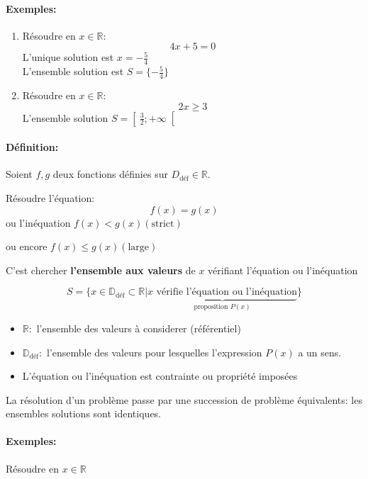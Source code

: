 \documentclass[
    11pt,
    a4paper,
    oneside,
    headinlcude, footinclude,
    twoside,
]{report}
\begin{document}
\paragraph{Exemples:}

\begin{enumerate}
    \item Résoudre en $x \in \mathbb{R}$:
        $$4x + 5 = 0$$
        L'unique solution est $x = - \frac{5}{4}$ \\
        L'ensemble solution est $S = \{- \frac{5}{4}\}$ 
    \item Résoudre en $x \in \mathbb{R}$:
        $$2x \geq 3$$
        L'ensemble solution $S = \left[\ \frac{3}{2}; + \infty\right[$ 
\end{enumerate}

\paragraph{Définition:}

Soient $f, g$ deux fonctions définies sur $D_{\text{déf}} \in \mathbb{R}$.

Résoudre l'équation:
$$f(x) = g(x)$$
ou l'inéquation $f(x) < g(x) (\text{strict})$ 

ou encore $f(x) \leq g(x) (\text{large})$ 

C'est chercher \textbf{l'ensemble aux valeurs} de $x$ vérifiant l'équation ou
l'inéquation

$$S = \{x \in \mathbb{D}_{ \text{déf}} \subset \mathbb{R} | \underbrace{x \text{ vérifie
l'équation ou l'inéquation}}_{ \text{proposition } P(x)}\}$$

\begin{itemize}
    \item $\mathbb{R}:$ l'ensemble des valeurs à considerer (référentiel)
    \item $\mathbb{D}_{\text{déf}}:$ l'ensemble des valeurs pour lesquelles l'expression
        $P(x)$ a un sens.
    \item L'équation ou l'inéquation est contrainte  ou propriété imposées
\end{itemize}

La résolution d'un problème passe par une succession de problème équivalents:
les ensembles solutions sont identiques.

\paragraph{Exemples:} Résoudre en $x \in \mathbb{R}$ 
\end{document}
